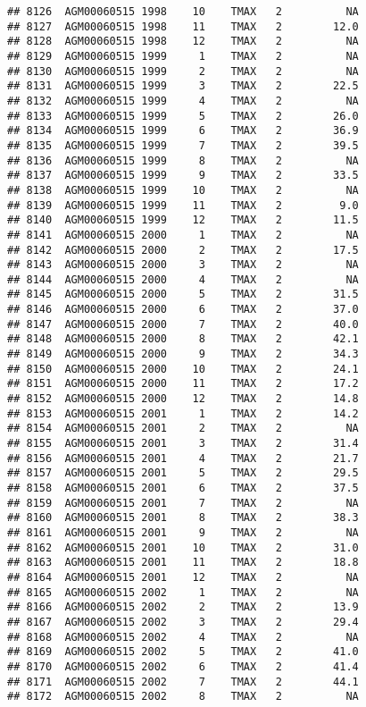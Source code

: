 \documentclass{article}\usepackage[]{graphicx}\usepackage[]{color}
\makeatletter
\newenvironment{kframe}{%
 \def\at@end@of@kframe{}%
 \ifinner\ifhmode%
  \def\at@end@of@kframe{\end{minipage}}%
  \begin{minipage}{\columnwidth}%
 \fi\fi%
 \def\FrameCommand##1{\hskip\@totalleftmargin \hskip-\fboxsep
 \colorbox{shadecolor}{##1}\hskip-\fboxsep
     \hskip-\linewidth \hskip-\@totalleftmargin \hskip\columnwidth}%
 \MakeFramed {\advance\hsize-\width
   \@totalleftmargin\z@ \linewidth\hsize
   \@setminipage}}%
 {\par\unskip\endMakeFramed%
 \at@end@of@kframe}
\newenvironment{knitrout}{}{} %
\makeatother
\begin{document}
\begin{knitrout}
\begin{kframe}
\begin{verbatim}
## 8126  AGM00060515 1998    10    TMAX   2          NA
## 8127  AGM00060515 1998    11    TMAX   2        12.0
## 8128  AGM00060515 1998    12    TMAX   2          NA
## 8129  AGM00060515 1999     1    TMAX   2          NA
## 8130  AGM00060515 1999     2    TMAX   2          NA
## 8131  AGM00060515 1999     3    TMAX   2        22.5
## 8132  AGM00060515 1999     4    TMAX   2          NA
## 8133  AGM00060515 1999     5    TMAX   2        26.0
## 8134  AGM00060515 1999     6    TMAX   2        36.9
## 8135  AGM00060515 1999     7    TMAX   2        39.5
## 8136  AGM00060515 1999     8    TMAX   2          NA
## 8137  AGM00060515 1999     9    TMAX   2        33.5
## 8138  AGM00060515 1999    10    TMAX   2          NA
## 8139  AGM00060515 1999    11    TMAX   2         9.0
## 8140  AGM00060515 1999    12    TMAX   2        11.5
## 8141  AGM00060515 2000     1    TMAX   2          NA
## 8142  AGM00060515 2000     2    TMAX   2        17.5
## 8143  AGM00060515 2000     3    TMAX   2          NA
## 8144  AGM00060515 2000     4    TMAX   2          NA
## 8145  AGM00060515 2000     5    TMAX   2        31.5
## 8146  AGM00060515 2000     6    TMAX   2        37.0
## 8147  AGM00060515 2000     7    TMAX   2        40.0
## 8148  AGM00060515 2000     8    TMAX   2        42.1
## 8149  AGM00060515 2000     9    TMAX   2        34.3
## 8150  AGM00060515 2000    10    TMAX   2        24.1
## 8151  AGM00060515 2000    11    TMAX   2        17.2
## 8152  AGM00060515 2000    12    TMAX   2        14.8
## 8153  AGM00060515 2001     1    TMAX   2        14.2
## 8154  AGM00060515 2001     2    TMAX   2          NA
## 8155  AGM00060515 2001     3    TMAX   2        31.4
## 8156  AGM00060515 2001     4    TMAX   2        21.7
## 8157  AGM00060515 2001     5    TMAX   2        29.5
## 8158  AGM00060515 2001     6    TMAX   2        37.5
## 8159  AGM00060515 2001     7    TMAX   2          NA
## 8160  AGM00060515 2001     8    TMAX   2        38.3
## 8161  AGM00060515 2001     9    TMAX   2          NA
## 8162  AGM00060515 2001    10    TMAX   2        31.0
## 8163  AGM00060515 2001    11    TMAX   2        18.8
## 8164  AGM00060515 2001    12    TMAX   2          NA
## 8165  AGM00060515 2002     1    TMAX   2          NA
## 8166  AGM00060515 2002     2    TMAX   2        13.9
## 8167  AGM00060515 2002     3    TMAX   2        29.4
## 8168  AGM00060515 2002     4    TMAX   2          NA
## 8169  AGM00060515 2002     5    TMAX   2        41.0
## 8170  AGM00060515 2002     6    TMAX   2        41.4
## 8171  AGM00060515 2002     7    TMAX   2        44.1
## 8172  AGM00060515 2002     8    TMAX   2          NA

\end{verbatim}
\end{kframe}
\end{knitrout}
\end{document}
